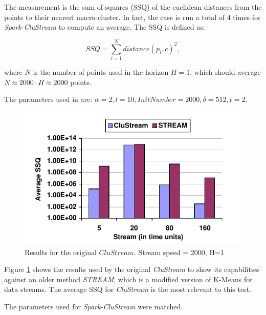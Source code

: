 \documentclass{llncs}
\begin{document}
The measurement is the sum of squares (SSQ) of the euclidean distances from the points to their nearest macro-cluster. In fact, the case is run a total of 4 times for \textit{Spark-CluStream} to compute an average. The SSQ is defined as:

\begin{equation}
 SSQ = \sum_{i=1}^N distance(p_i,c)^2,
\end{equation}

where $N$ is the number of points used in the horizon $H=1$, which should average $N \approx 2000\cdot H \approx 2000$ points.

The parameters used in \cite{clustreamOrig} are: $\alpha=2,l=10,InitNumber=2000,\delta=512,t=2$.

\begin{figure}[h]
 \centering
 \includegraphics[scale=0.6]{./styles/2000h1-orig.png}
 \caption{Results for the original $CluStream$\cite{clustreamOrig}. Stream speed = 2000, H=1}
 \label{fig:2000orig}
\end{figure}

Figure \ref{fig:2000orig} shows the results used by the original \textit{CluStream} to show its capabilities against an older method \textit{STREAM}, which is a modified version of K-Means for data streams. The average SSQ for \textit{CluStream} is the most relevant to this test.

The parameters used for \textit{Spark-CluStream} were matched. 
\end{document}
